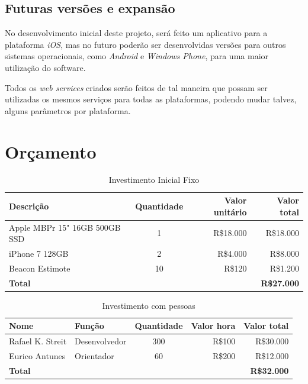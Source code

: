 \documentclass[
	12pt,
	oneside,
	a4paper,
	english,
	brazil,
]{abntex2}
\begin{document}
\section{Futuras versões e expansão}

No desenvolvimento inicial deste projeto, será feito um aplicativo para a plataforma \emph{iOS}, mas no futuro poderão ser desenvolvidas versões para outros sistemas operacionais, como \emph{Android} e \emph{Windows Phone}, para uma maior utilização do software.

Todos os \emph{web services} criados serão feitos de tal maneira que possam ser utilizadas os mesmos serviços para todas as plataformas, podendo mudar talvez, alguns parâmetros por plataforma.



\chapter{Orçamento}

\noindent
\begin{table}[ht]
    \caption{Investimento Inicial Fixo}
    
    \begin{tabularx}{\textwidth}{X|c|r|r}
    \hline
        \textbf{Descrição} &
        \textbf{Quantidade} & 
        \textbf{Valor unitário} & 
        \textbf{Valor total} \\
    \hline
        Apple MBPr 15" 16GB 500GB SSD&1&R\$18.000&R\$18.000 \\
        iPhone 7 128GB&2&R\$4.000&R\$8.000 \\
        Beacon Estimote&10&R\$120&R\$1.200 \\ [1ex]
    \hline
        \textbf{Total}&&&\textbf{R\$27.000} \\ [1ex]
    \end{tabularx}
\end{table}

\noindent
\begin{table}[ht]
    \caption{Investimento com pessoas}

    \begin{tabularx}{\textwidth}{X|l|c|r|r}
    \hline
        \textbf{Nome} & 
        \textbf{Função} & 
        \textbf{Quantidade} & 
        \textbf{Valor hora} &
        \textbf{Valor total} \\
    \hline
        Rafael K. Streit&Desenvolvedor &300&R\$100&R\$30.000\\
        Eurico Antunes&Orientador&60&R\$200&R\$12.000 \\
    \hline
        \textbf{Total} &&&& \textbf{R\$32.000} \\
    \end{tabularx}
\end{table}
\end{document}
